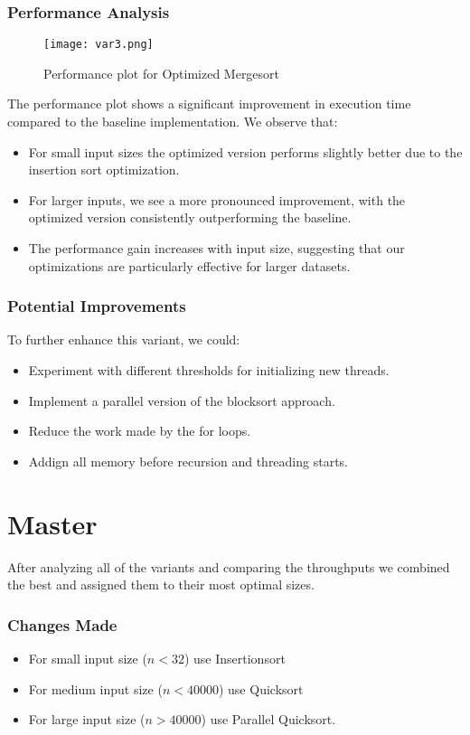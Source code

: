 \documentclass[twocolumn]{article}
\begin{document}
\subsubsection{Performance Analysis}
\begin{figure}[H]
    \centering
    \texttt{[image: var3.png]}
    \caption{Performance plot for Optimized Mergesort}
    \label{fig:variant4_plot}
\end{figure}

The performance plot shows a significant improvement in execution time compared to the baseline  implementation. We observe that:
\begin{itemize}
    \item For small input sizes the optimized version performs slightly better due to the insertion sort optimization.
    \item For larger inputs, we see a more pronounced improvement, with the optimized version consistently outperforming the baseline.
    \item The performance gain increases with input size, suggesting that our optimizations are particularly effective for larger datasets.
\end{itemize}

\subsubsection{Potential Improvements}
To further enhance this variant, we could:
\begin{itemize}
    \item Experiment with different thresholds for initializing new threads.
    \item Implement a parallel version of the blocksort approach.
    \item Reduce the work made by the for loops.
    \item Addign all memory before recursion and threading starts.
\end{itemize}

\section{Master}

After analyzing all of the variants and comparing the throughputs we combined the best and assigned them to their most optimal sizes.

\subsubsection{Changes Made}
\begin{itemize}
	\item For small input size ($n<32$) use Insertionsort
	\item For medium input size ($n<40000$) use Quicksort
	\item For large input size ($n > 40000$) use Parallel Quicksort.
\end{itemize}
\end{document}

